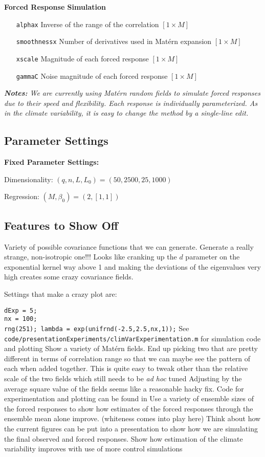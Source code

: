 \documentclass[11pt]{article}
\begin{document}
\textbf{Forced Response Simulation}
\begin{itemize}
\item[ \texttt{alphax}] Inverse of the range of the correlation $[1 \times M]$
\item[\texttt{smoothnessx}] Number of derivatives used in Mat\'ern expansion $[1 \times M]$
\item[\texttt{xscale}] Magnitude of each forced response $[1 \times M]$
\item[\texttt{gammaC}] Noise magnitude of each forced response $[1 \times M]$
\end{itemize}
\emph{\textbf{Notes: }We are currently using Mat\'ern random fields to simulate forced responses due to their speed and flexibility. Each response is individually parameterized. As in the climate variability, it is easy to change the method by a single-line edit.}

\clearpage
\subsection{Parameter Settings}
\textbf{Fixed Parameter Settings:} 

Dimensionality: $(q,n,L,L_0) = (50,2500,25,1000)$

Regression: $(M,\beta_0) = (2,[1,1])$



\subsection{Features to Show Off}
\begin{outline}
\1 Variety of possible covariance functions that we can generate. Generate a really strange, non-isotropic one!!!
\2 Looks like cranking up the $d$ parameter on the exponential kernel way above 1 and making the deviations of the eigenvalues very high creates some crazy covariance fields.

\2Settings that make a crazy plot are: 

\texttt{dExp = 5; }\\
\texttt{nx = 100;}\\
\texttt{rng(251); lambda = exp(unifrnd(-2.5,2.5,nx,1));}
\2 See \texttt{code/presentationExperiments/climVarExperimentation.m} for simulation code and plotting
\1 Show a variety of Mat\'ern fields. End up picking two that are pretty different in terms of correlation range so that we can maybe see the pattern of each when added together.
\2 This is quite easy to tweak other than the relative scale of the two fields which still needs to be \emph{ad hoc} tuned 
\2 Adjusting by the average square value of the fields seems like a reasonable hacky fix. 
\2 Code for experimentation and plotting can be found in 
\1 Use a variety of ensemble sizes of the forced responses to show how estimates of the forced responses through the ensemble mean alone improve. (whiteness comes into play here)
\1 Think about how the current figures can be put into a presentation to show how we are simulating the final observed and forced responses.
\1 Show how estimation of the climate variability improves with use of more control simulations

\end{outline}
\end{document}

